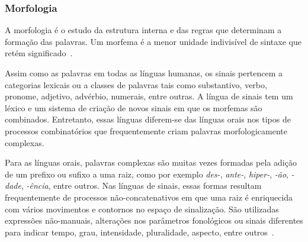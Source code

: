 


\subsubsection{Morfologia}
\label{linguistica-gramatica-morfologia}

A morfologia é o estudo da estrutura interna e das regras que determinam a formação das palavras. Um morfema é a menor unidade indivisível de sintaxe que retém significado~\cite{quadros-2004-estudos-linguisticos,jay-2011-dont-just-sign}.

Assim como as palavras em todas as línguas humanas, os sinais pertencem a categorias lexicais ou a classes de palavras tais como substantivo, verbo, pronome, adjetivo, advérbio, numerais, entre outras. A língua de sinais tem um léxico e um sistema de criação de novos sinais em que os morfemas são combinados. Entretanto, essas línguas diferem-se das línguas orais nos tipos de processos combinatórios que frequentemente criam palavras morfologicamente complexas. 

Para as línguas orais, palavras complexas são muitas vezes formadas pela adição de um prefixo ou sufixo a uma raiz, como por exemplo \textit{des-}, \textit{ante-}, \textit{hiper-}, \textit{-ão}, \textit{-dade}, \textit{-ência}, entre outros. Nas línguas de sinais, essas formas resultam frequentemente de processos não-concatenativos em que uma raiz é enriquecida com vários movimentos e contornos no espaço de sinalização. São utilizadas expressões não-manuais, alterações nos parâmetros fonológicos ou sinais diferentes para indicar tempo, grau, intensidade, pluralidade, aspecto, entre outros~\cite{klima-bellugi-1975-wit-poetry-asl,quadros-2004-estudos-linguisticos}.


